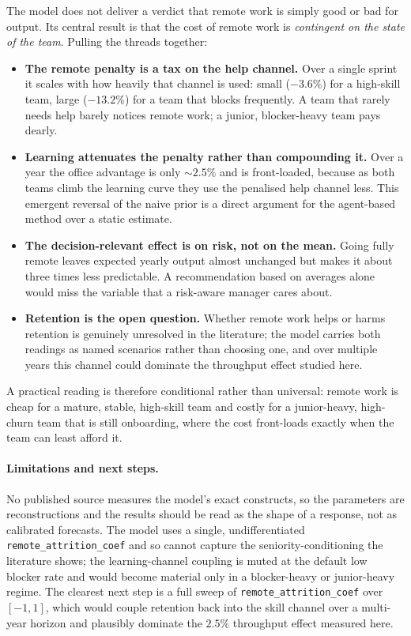 \documentclass[11pt,a4paper]{article}
\begin{document}
The model does not deliver a verdict that remote work is simply good or bad for output. Its central
result is that the cost of remote work is \emph{contingent on the state of the team}. Pulling the
threads together:

\begin{itemize}
\item \textbf{The remote penalty is a tax on the help channel.} Over a single sprint it scales with
how heavily that channel is used: small ($-3.6\%$) for a high-skill team, large ($-13.2\%$) for a
team that blocks frequently. A team that rarely needs help barely notices remote work; a junior,
blocker-heavy team pays dearly.
\item \textbf{Learning attenuates the penalty rather than compounding it.} Over a year the office
advantage is only $\sim$$2.5\%$ and is front-loaded, because as both teams climb the learning curve
they use the penalised help channel less. This emergent reversal of the naive prior is a direct
argument for the agent-based method over a static estimate.
\item \textbf{The decision-relevant effect is on risk, not on the mean.} Going fully remote leaves
expected yearly output almost unchanged but makes it about three times less predictable. A
recommendation based on averages alone would miss the variable that a risk-aware manager cares about.
\item \textbf{Retention is the open question.} Whether remote work helps or harms retention is
genuinely unresolved in the literature; the model carries both readings as named scenarios rather than
choosing one, and over multiple years this channel could dominate the throughput effect studied here.
\end{itemize}

A practical reading is therefore conditional rather than universal: remote work is cheap for a mature,
stable, high-skill team and costly for a junior-heavy, high-churn team that is still onboarding, where
the cost front-loads exactly when the team can least afford it.

\paragraph{Limitations and next steps.} No published source measures the model's exact constructs, so
the parameters are reconstructions and the results should be read as the shape of a response, not as
calibrated forecasts. The model uses a single, undifferentiated \texttt{remote\_attrition\_coef} and
so cannot capture the seniority-conditioning the literature shows; the learning-channel coupling is
muted at the default low blocker rate and would become material only in a blocker-heavy or
junior-heavy regime. The clearest next step is a full sweep of \texttt{remote\_attrition\_coef} over
$[-1,1]$, which would couple retention back into the skill channel over a multi-year horizon and
plausibly dominate the $2.5\%$ throughput effect measured here.
\end{document}

